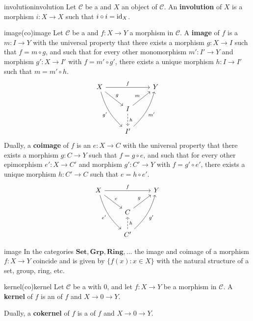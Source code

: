 \begin{topic}{involution}{involution}
    Let $\mathcal{C}$ be a  and $X$ an object of $\mathcal{C}$. An \textbf{involution} of $X$ is a morphism $i \colon X \to X$ such that $i \circ i = \textup{id}_X$.
\end{topic}

\begin{topic}{image}{(co)image}
    Let $\mathcal{C}$ be a  and $f \colon X \to Y$ a morphism in $\mathcal{C}$. A \textbf{image} of $f$ is a  $m \colon I \to Y$ with the universal property that there exists a morphism $g \colon X \to I$ such that $f = m \circ g$, and such that for every other monomorphism $m' \colon I' \to Y$ and morphism $g' \colon X \to I'$ with $f = m' \circ g'$, there exists a unique morphism $h \colon I \to I'$ such that $m = m' \circ h$.
    \[ \svg \begin{tikzcd}
        X \arrow{rr}{f} \arrow{dr}{g} \arrow[swap, bend right=15]{ddr}{g'} & & Y \\
        & I \arrow{ur}{m} \arrow[dashed]{d}{h} & \\
        & I' \arrow[swap, bend right=15]{uur}{m'}
    \end{tikzcd} \]
    Dually, a \textbf{coimage} of $f$ is an  $e \colon X \to C$ with the universal property that there exists a morphism $g \colon C \to Y$ such that $f = g \circ e$, and such that for every other epimorphism $e' \colon X \to C'$ and morphism $g' \colon C' \to Y$ with $f = g' \circ e'$, there exists a unique morphism $h \colon C' \to C$ such that $e = h \circ e'$.
    \[ \svg \begin{tikzcd}
        X \arrow{rr}{f} \arrow{dr}{e} \arrow[swap, bend right=15]{ddr}{e'} & & Y \\
        & C \arrow{ur}{g} & \\
        & C' \arrow[swap, bend right=15]{uur}{g'} \arrow[swap, dashed]{u}{h}
    \end{tikzcd} \]
\end{topic}

\begin{example}{image}
    In the categories $\textbf{Set}, \textbf{Grp}, \textbf{Ring}, \ldots$ the image and coimage of a morphism $f \colon X \to Y$ coincide and is given by $\{ f(x) : x \in X \}$ with the natural structure of a set, group, ring, etc.
\end{example}

\begin{topic}{kernel}{(co)kernel}
    Let $\mathcal{C}$ be a  with  $0$, and let $f \colon X \to Y$ be a morphism in $\mathcal{C}$. A \textbf{kernel} of $f$ is an  of $f$ and $X \to 0 \to Y$.

    Dually, a \textbf{cokernel} of $f$ is a  of $f$ and $X \to 0 \to Y$.
\end{topic}

